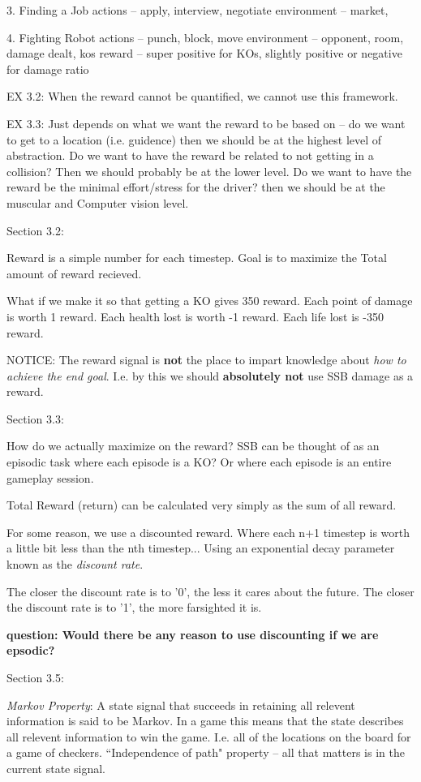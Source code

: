 3. Finding a Job
actions -- apply, interview, negotiate
environment -- market, 

4. Fighting Robot
actions -- punch, block, move
environment -- opponent, room, damage dealt, kos
reward -- super positive for KOs, slightly positive or negative for damage ratio

EX 3.2:
When the reward cannot be quantified, we cannot use this framework.

EX 3.3:
Just depends on what we want the reward to be based on -- do we want to get to a location (i.e. guidence) then we should be at the highest level of abstraction.
Do we want to have the reward be related to not getting in a collision? Then we should probably be at the lower level.
Do we want to have the reward be the minimal effort/stress for the driver? then we should be at the muscular and Computer vision level.


Section 3.2:

Reward is a simple number for each timestep.
Goal is to maximize the Total amount of reward recieved.

What if we make it so that getting a KO gives 350 reward.
Each point of damage is worth 1 reward.
Each health lost is worth -1 reward.
Each life lost is -350 reward.

NOTICE: The reward signal is \textbf{not} the place to impart knowledge about \textit{how to achieve the end goal}.
I.e. by this we should \textbf{absolutely not} use SSB damage as a reward.

Section 3.3: 

How do we actually maximize on the reward?
SSB can be thought of as an episodic task where each episode is a KO?
Or where each episode is an entire gameplay session.

Total Reward (return) can be calculated very simply as the sum of all reward.

For some reason, we use a discounted reward.
Where each n+1 timestep is worth a little bit less than the nth timestep...
Using an exponential decay parameter known as the \textit{discount rate}.

The closer the discount rate is to '0', the less it cares about the future.
The closer the discount rate is to '1', the more farsighted it is.

\textbf{question: Would there be any reason to use discounting if we are epsodic?}


Section 3.5:

\textit{Markov Property}: A state signal that succeeds in retaining all relevent information is said to be Markov.
In a game this means that the state describes all relevent information to win the game.
I.e. all of the locations on the board for a game of checkers.
``Independence of path" property -- all that matters is in the current state signal.

